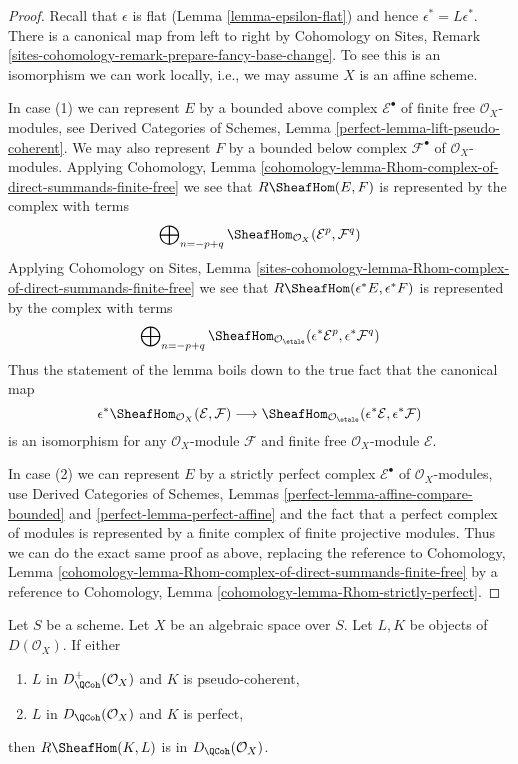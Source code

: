 \begin{proof}
Recall that $\epsilon$ is flat (Lemma \ref{lemma-epsilon-flat}) and
hence $\epsilon^* = L\epsilon^*$. There is a canonical map
from left to right by
Cohomology on Sites, Remark
\ref{sites-cohomology-remark-prepare-fancy-base-change}.
To see this is an isomorphism we can work locally, i.e., we may
assume $X$ is an affine scheme.

\medskip\noindent
In case (1) we can represent $E$ by a bounded above complex
$\mathcal{E}^\bullet$ of finite free $\mathcal{O}_X$-modules, see
Derived Categories of Schemes, Lemma \ref{perfect-lemma-lift-pseudo-coherent}.
We may also represent $F$ by a bounded below complex $\mathcal{F}^\bullet$
of $\mathcal{O}_X$-modules. Applying
Cohomology, Lemma
\ref{cohomology-lemma-Rhom-complex-of-direct-summands-finite-free}
we see that $R\SheafHom(E, F)$ is represented by the complex with terms
$$
\bigoplus\nolimits_{n = - p + q}
\SheafHom_{\mathcal{O}_X}(\mathcal{E}^p, \mathcal{F}^q)
$$
Applying Cohomology on Sites, Lemma
\ref{sites-cohomology-lemma-Rhom-complex-of-direct-summands-finite-free}
we see that $R\SheafHom(\epsilon^*E, \epsilon^*F)$ is represented by the
complex with terms
$$
\bigoplus\nolimits_{n = - p + q}
\SheafHom_{\mathcal{O}_\etale}
(\epsilon^*\mathcal{E}^p, \epsilon^*\mathcal{F}^q)
$$
Thus the statement of the lemma boils down to the true fact
that the canonical map
$$
\epsilon^*\SheafHom_{\mathcal{O}_X}(\mathcal{E}, \mathcal{F})
\longrightarrow
\SheafHom_{\mathcal{O}_\etale}
(\epsilon^*\mathcal{E}, \epsilon^*\mathcal{F})
$$
is an isomorphism for any $\mathcal{O}_X$-module $\mathcal{F}$ and
finite free $\mathcal{O}_X$-module $\mathcal{E}$.

\medskip\noindent
In case (2) we can represent $E$ by a strictly perfect
complex $\mathcal{E}^\bullet$ of $\mathcal{O}_X$-modules, use
Derived Categories of Schemes, Lemmas
\ref{perfect-lemma-affine-compare-bounded} and
\ref{perfect-lemma-perfect-affine} and the fact that a perfect
complex of modules is represented by a finite complex of finite
projective modules. Thus we can do the exact same proof as
above, replacing the reference to
Cohomology, Lemma
\ref{cohomology-lemma-Rhom-complex-of-direct-summands-finite-free}
by a reference to
Cohomology, Lemma
\ref{cohomology-lemma-Rhom-strictly-perfect}.
\end{proof}

\begin{lemma}
\label{lemma-quasi-coherence-internal-hom}
Let $S$ be a scheme. Let $X$ be an algebraic space over $S$.
Let $L, K$ be objects of $D(\mathcal{O}_X)$.
If either
\begin{enumerate}
\item $L$ in $D^+_\QCoh(\mathcal{O}_X)$ and $K$ is pseudo-coherent,
\item $L$ in $D_\QCoh(\mathcal{O}_X)$ and $K$ is perfect,
\end{enumerate}
then $R\SheafHom(K, L)$ is in $D_\QCoh(\mathcal{O}_X)$.
\end{lemma}

